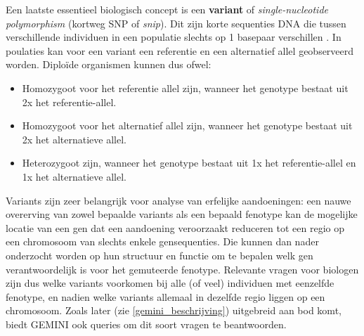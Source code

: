 Een laatste essentieel biologisch concept is een \textbf{variant} of \textit{single-nucleotide polymorphism} (kortweg SNP of \textit{snip}). Dit zijn korte sequenties DNA die tussen verschillende individuen in een populatie slechts op 1 basepaar verschillen \cite{alberts2007molecular}. In poulaties kan voor een variant een referentie en een alternatief allel geobserveerd worden. Diplo\"ide organismen kunnen dus ofwel:
\begin{itemize}
\item Homozygoot voor het referentie allel zijn, wanneer het genotype bestaat uit 2x het referentie-allel.
\item Homozygoot voor het alternatief allel zijn, wanneer het genotype bestaat uit 2x het alternatieve allel.
\item Heterozygoot zijn, wanneer het genotype bestaat uit 1x het referentie-allel en 1x het alternatieve allel.
\end{itemize}
Variants zijn zeer belangrijk voor analyse van erfelijke aandoeningen: een nauwe overerving van zowel bepaalde variants als een bepaald fenotype kan de mogelijke locatie van een gen dat een aandoening veroorzaakt reduceren tot een regio op een chromosoom van slechts enkele gensequenties. Die kunnen dan nader onderzocht worden op hun structuur en functie om te bepalen welk gen verantwoordelijk is voor het gemuteerde fenotype. Relevante vragen voor biologen zijn dus welke variants voorkomen bij alle (of veel) individuen met eenzelfde fenotype, en nadien welke variants allemaal in dezelfde regio liggen op een chromosoom. Zoals later (zie \ref{gemini_beschrijving}) uitgebreid aan bod komt, biedt GEMINI ook queries om dit soort vragen te beantwoorden.\\

